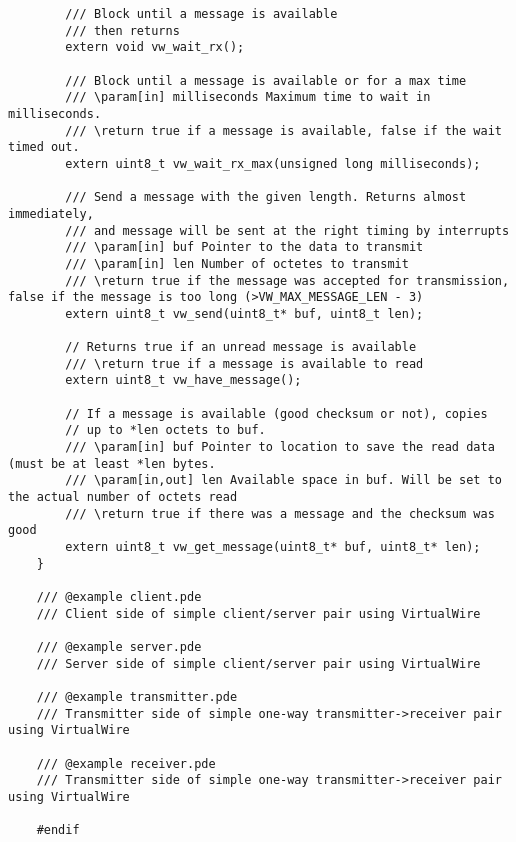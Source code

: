 \begin{verbatim}
        /// Block until a message is available
        /// then returns
        extern void vw_wait_rx();

        /// Block until a message is available or for a max time
        /// \param[in] milliseconds Maximum time to wait in milliseconds.
        /// \return true if a message is available, false if the wait timed out.
        extern uint8_t vw_wait_rx_max(unsigned long milliseconds);

        /// Send a message with the given length. Returns almost immediately,
        /// and message will be sent at the right timing by interrupts
        /// \param[in] buf Pointer to the data to transmit
        /// \param[in] len Number of octetes to transmit
        /// \return true if the message was accepted for transmission, false if the message is too long (>VW_MAX_MESSAGE_LEN - 3)
        extern uint8_t vw_send(uint8_t* buf, uint8_t len);

        // Returns true if an unread message is available
        /// \return true if a message is available to read
        extern uint8_t vw_have_message();

        // If a message is available (good checksum or not), copies
        // up to *len octets to buf.
        /// \param[in] buf Pointer to location to save the read data (must be at least *len bytes.
        /// \param[in,out] len Available space in buf. Will be set to the actual number of octets read
        /// \return true if there was a message and the checksum was good
        extern uint8_t vw_get_message(uint8_t* buf, uint8_t* len);
    }

    /// @example client.pde
    /// Client side of simple client/server pair using VirtualWire

    /// @example server.pde
    /// Server side of simple client/server pair using VirtualWire

    /// @example transmitter.pde
    /// Transmitter side of simple one-way transmitter->receiver pair using VirtualWire

    /// @example receiver.pde
    /// Transmitter side of simple one-way transmitter->receiver pair using VirtualWire

    #endif
\end{verbatim}

